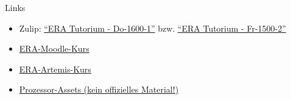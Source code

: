 \begin{frame}[c, fragile]{Links}{}
	\begin{itemize}
		\item Zulip: \href{https://zulip.in.tum.de/#narrow/stream/2661-ERA-Tutorium---Do-1600-1}{\enquote{ERA Tutorium - Do-1600-1}}
		      bzw. \href{https://zulip.in.tum.de/#narrow/stream/2675-ERA-Tutorium---Fr-1500-2 }{\enquote{ERA Tutorium - Fr-1500-2}}
		\item \href{https://www.moodle.tum.de/course/view.php?id=100633}{ERA-Moodle-Kurs}
		\item \href{https://artemis.in.tum.de/courses/401}{ERA-Artemis-Kurs}
		\item \href{https://courses.edx.org/assets/courseware/v1/f06a2dc0c856f60ec0711e9f5e1c98cf/asset-v1:HarveyMuddX+ENGR85B+1T2023+type@asset+block/FinalReferences.pdf}{Prozessor-Assets (kein offizielles Material!)}
	\end{itemize}
\end{frame}

\maketitle


